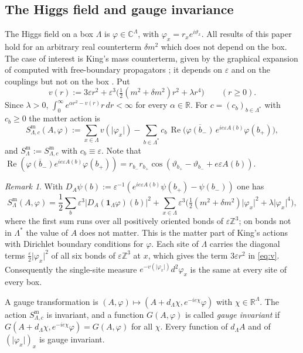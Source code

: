 \documentclass[11pt]{amsart}
\theoremstyle{plain}
\theoremstyle{definition}
\theoremstyle{remark}
\newtheorem{remark}[theorem]{Remark}
\numberwithin{equation}{section}
\newcommand{\R}{\mathbb{R}}
\newcommand{\Z}{\mathbb{Z}}
\newcommand{\C}{\mathbb{C}}
\newcommand{\eps}{\varepsilon}
\newcommand{\abs}[1]{\lvert #1\rvert}
\DeclareMathOperator{\re}{Re}
\begin{document}
\subsection{The Higgs field and gauge invariance}
The Higgs field on a box $\Lambda$ is $\varphi\in\C^\Lambda$, with $\varphi_x=r_xe^{i\vartheta_x}$. All results of this paper hold for an arbitrary real counterterm $\delta m^2$ which does not depend on the box. The case of interest is King's mass counterterm, given by the graphical expansion of \cite[Sect.~3.3]{K1} computed with free-boundary propagators \cite[p.~330]{K2}; it depends on $\eps$ and on the couplings but not on the box \cite[p.~334]{K2}. Put
\begin{equation}\label{eq:v}
v(r):=3\eps r^2+\eps^3\big(\tfrac12(m^2+\delta m^2)r^2+\lambda r^4\big)\qquad(r\ge0).
\end{equation}
Since $\lambda>0$, $\int_0^\infty e^{\alpha r^2-v(r)}r\,dr<\infty$ for every $\alpha\in\R$. For $c=(c_b)_{b\in\Lambda^*}$ with $c_b\ge0$ the matter action is
\begin{equation}\label{eq:matter}
S^{\mathrm m}_{\Lambda,c}(A,\varphi):=\sum_{x\in\Lambda}v(\abs{\varphi_x})-\sum_{b\in\Lambda^*}c_b\,\re\big(\overline{\varphi(b_-)}\,e^{ie\eps A(b)}\varphi(b_+)\big),
\end{equation}
and $S^{\mathrm m}_\Lambda:=S^{\mathrm m}_{\Lambda,c}$ with $c_b\equiv\eps$. Note that $\re(\overline{\varphi(b_-)}e^{ie\eps A(b)}\varphi(b_+))=r_{b_-}r_{b_+}\cos(\vartheta_{b_+}-\vartheta_{b_-}+e\eps A(b))$.

\begin{remark}\label{rem:matter}
With $D_A\psi(b):=\eps^{-1}(e^{ie\eps A(b)}\psi(b_+)-\psi(b_-))$ one has
\[
S^{\mathrm m}_\Lambda(A,\varphi)=\frac12\sum_b\eps^3\abs{D_A(\mathbf 1_\Lambda\varphi)(b)}^2+\sum_{x\in\Lambda}\eps^3\big(\tfrac12(m^2+\delta m^2)\abs{\varphi_x}^2+\lambda\abs{\varphi_x}^4\big),
\]
where the first sum runs over all positively oriented bonds of $\eps\Z^3$; on bonds not in $\Lambda^*$ the value of $A$ does not matter. This is the matter part of King's actions \cite[(2.5), (3.38)]{K2} with Dirichlet boundary conditions for $\varphi$. Each site of $\Lambda$ carries the diagonal terms $\frac\eps2\abs{\varphi_x}^2$ of all six bonds of $\eps\Z^3$ at $x$, which gives the term $3\eps r^2$ in \eqref{eq:v}. Consequently the single-site measure $e^{-v(\abs{\varphi_x})}d^2\varphi_x$ is the same at every site of every box.
\end{remark}

A gauge transformation is $(A,\varphi)\mapsto(A+d_\Lambda\chi,e^{-ie\chi}\varphi)$ with $\chi\in\R^\Lambda$. The action $S^{\mathrm m}_{\Lambda,c}$ is invariant, and a function $G(A,\varphi)$ is called \emph{gauge invariant} if $G(A+d_\Lambda\chi,e^{-ie\chi}\varphi)=G(A,\varphi)$ for all $\chi$. Every function of $d_\Lambda A$ and of $(\abs{\varphi_x})_x$ is gauge invariant.
\end{document}
